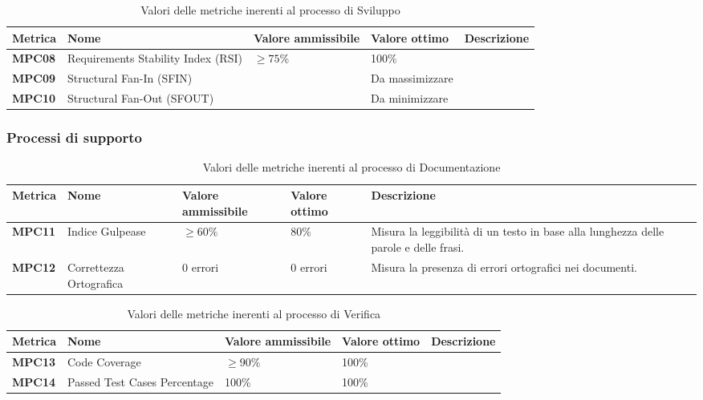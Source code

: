 \documentclass[italian,12pt]{article} %
\begin{document}
\newpage
{}

\begin{table}[h!]
	\centering
	\begin{tabularx}{\textwidth}{|X|X|X|X|X|} 	 
		\hline
		\textbf{Metrica} 	& \textbf{Nome} & \textbf{Valore ammissibile} & \textbf{Valore ottimo} & \textbf{Descrizione}\\  	 
		\hline
		\textbf{MPC08} 		& Requirements Stability Index (RSI) 	& $\geq 75\% $ 			& 100\% & \\
		\hline
		\textbf{MPC09} 		& Structural Fan-In (SFIN) 				&  						& Da massimizzare & \\ 
		\hline
		\textbf{MPC10} 		& Structural Fan-Out (SFOUT) 			&  						& Da minimizzare & \\ 
		\hline
	\end{tabularx}
	\caption{ Valori delle metriche inerenti al processo di Sviluppo}
	\label{table:2}
	\end{table}

\subsubsection{Processi di supporto}


\begin{table}[h!]
	\centering
	\begin{tabularx}{\textwidth}{|X|X|X|X|X|} 	 
		\hline
		\textbf{Metrica} 	& \textbf{Nome} & \textbf{Valore ammissibile} & \textbf{Valore ottimo}& \textbf{Descrizione}\\  	 
		\hline
		\textbf{MPC11} & Indice Gulpease & $\geq 60\% $ & 80\% & Misura la leggibilità di un testo in base alla lunghezza delle parole e delle frasi.\\
		\hline
		\textbf{MPC12} & Correttezza Ortografica & 0 errori & 0 errori &Misura la presenza di errori ortografici nei documenti.\\ 
		\hline
	\end{tabularx}
	\caption{ Valori delle metriche inerenti al processo di Documentazione}
	\label{table:3}
	\end{table}

\begin{table}[h!]
	\centering
	\begin{tabularx}{\textwidth}{|X|X|X|X|X|} 	 
		\hline
		\textbf{Metrica} 	& \textbf{Nome} & \textbf{Valore ammissibile} & \textbf{Valore ottimo}& \textbf{Descrizione}\\  	 
		\hline
		\textbf{MPC13} & Code Coverage & $\geq 90\% $ & 100\% &\\
		\hline
		\textbf{MPC14} & Passed Test Cases Percentage & 100\% & 100\% &\\ 
		\hline
	\end{tabularx}
	\caption{ Valori delle metriche inerenti al processo di Verifica}
	\label{table:4}
	\end{table}
\end{document}
